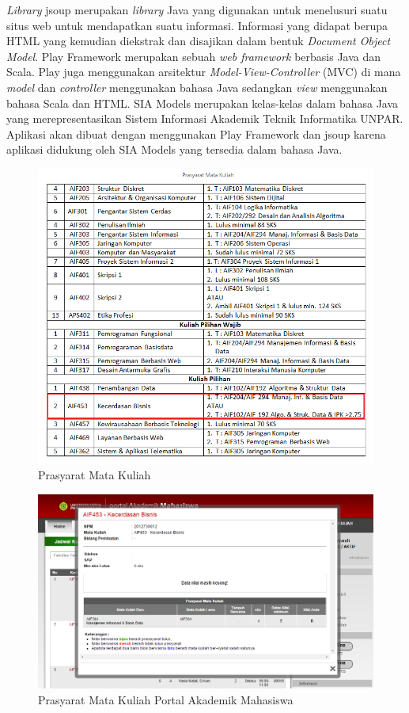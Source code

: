 \textit{Library} jsoup\cite{jsoup} merupakan \textit{library} Java yang digunakan untuk menelusuri suatu situs web untuk mendapatkan suatu informasi. Informasi yang didapat berupa HTML yang kemudian diekstrak dan disajikan dalam bentuk \textit{Document Object Model}. Play Framework\cite{Leroux:2014} merupakan sebuah \textit{web framework} berbasis Java dan Scala. Play juga menggunakan arsitektur \textit{Model-View-Controller} (MVC) di mana \textit{model} dan \textit{controller} menggunakan bahasa Java sedangkan \textit{view} menggunakan bahasa Scala dan HTML. SIA Models\cite{siamodels} merupakan kelas-kelas dalam bahasa Java yang merepresentasikan Sistem Informasi Akademik Teknik Informatika UNPAR. Aplikasi akan dibuat dengan menggunakan Play Framework dan jsoup karena aplikasi didukung oleh SIA Models yang tersedia dalam bahasa Java. 

\begin{figure}[H]
	\centering
	\includegraphics[scale=0.5]{Gambar/contoh-tinyurl}
	\caption{Prasyarat Mata Kuliah\cite{prasyaratIT}}
	\label{fig:1_prasyarat_tinyurl}
\end{figure}

\begin{figure}[H]
	\centering
	\includegraphics[scale=0.5]{Gambar/contoh-portal}
	\caption{Prasyarat Mata Kuliah Portal Akademik Mahasiswa\cite{studentportalunpar}}
	\label{fig:1_prasyarat_student_portal}
\end{figure}

